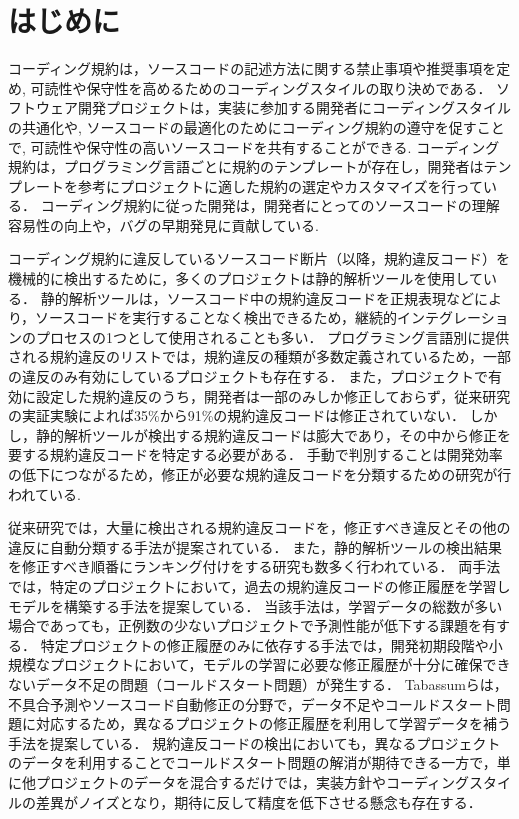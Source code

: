 \documentclass[11pt]{jreport}
\begin{document}

\newpage
{}


\chapter{はじめに}

コーディング規約は，ソースコードの記述方法に関する禁止事項や推奨事項を定め, 可読性や保守性を高めるためのコーディングスタイルの取り決めである．
ソフトウェア開発プロジェクトは，実装に参加する開発者にコーディングスタイルの共通化や, ソースコードの最適化のためにコーディング規約の遵守を促すことで, 可読性や保守性の高いソースコードを共有することができる\cite{EffectsSAT}. 
コーディング規約は，プログラミング言語ごとに規約のテンプレートが存在し，開発者はテンプレートを参考にプロジェクトに適した規約の選定やカスタマイズを行っている．
コーディング規約に従った開発は，開発者にとってのソースコードの理解容易性の向上や，バグの早期発見に貢献している\cite{Beller2}\cite{Johnson}\cite{Beller}.

コーディング規約に違反しているソースコード断片（以降，規約違反コード）を機械的に検出するために，多くのプロジェクトは静的解析ツールを使用している．
静的解析ツールは，ソースコード中の規約違反コードを正規表現などにより，ソースコードを実行することなく検出できるため，継続的インテグレーションのプロセスの1つとして使用されることも多い．
プログラミング言語別に提供される規約違反のリストでは，規約違反の種類が多数定義されているため，一部の違反のみ有効にしているプロジェクトも存在する\cite{規約の設定}．
また，プロジェクトで有効に設定した規約違反のうち，開発者は一部のみしか修正しておらず，従来研究の実証実験によれば35\%から91\%の規約違反コードは修正されていない\cite{静的解析ツールの修正率}．
しかし，静的解析ツールが検出する規約違反コードは膨大であり，その中から修正を要する規約違反コードを特定する必要がある．
手動で判別することは開発効率の低下につながるため，修正が必要な規約違反コードを分類するための研究が行われている\cite{Nguyen}.


従来研究では，大量に検出される規約違反コードを，修正すべき違反とその他の違反に自動分類する手法が提案されている\cite{JyuraiPre}．
また，静的解析ツールの検出結果を修正すべき順番にランキング付けをする研究も数多く行われている\cite{優先度づけ}．
両手法では，特定のプロジェクトにおいて，過去の規約違反コードの修正履歴を学習しモデルを構築する手法を提案している．
当該手法は，学習データの総数が多い場合であっても，正例数の少ないプロジェクトで予測性能が低下する課題を有する．
特定プロジェクトの修正履歴のみに依存する手法では，開発初期段階や小規模なプロジェクトにおいて，モデルの学習に必要な修正履歴が十分に確保できないデータ不足の問題（コールドスタート問題）が発生する．
Tabassumらは，不具合予測やソースコード自動修正の分野で，データ不足やコールドスタート問題に対応するため，異なるプロジェクトの修正履歴を利用して学習データを補う手法を提案している\cite{Tabassum}．
規約違反コードの検出においても，異なるプロジェクトのデータを利用することでコールドスタート問題の解消が期待できる一方で，単に他プロジェクトのデータを混合するだけでは，実装方針やコーディングスタイルの差異がノイズとなり，期待に反して精度を低下させる懸念も存在する．
\end{document}
